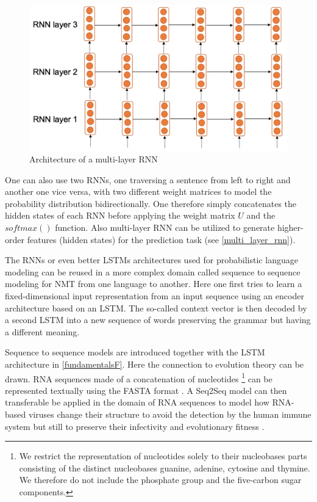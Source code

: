 \begin{figure}[ht]
	\centering
	\includegraphics[width=0.6\linewidth]{figures/multi_layer_rnn.png}
	\caption{Architecture of a multi-layer  \ac{RNN} \cite[p. 87]{Gertz2020}}
	\label{multi_layer_rnn}
\end{figure}

One can also use two \acp{RNN}, one traversing a sentence from left to right and another one vice versa, with two different weight matrices to model the probability distribution bidirectionally. One therefore simply concatenates the hidden states of each \ac{RNN} before applying the weight matrix $U$ and the $softmax()$ function. Also multi-layer \acs{RNN} can be utilized to generate higher-order features (hidden states) for the prediction task (see \autoref{multi_layer_rnn}). \cite{Gertz2020}

The \acp{RNN} or even better \acp{LSTM} architectures used for probabilistic language modeling can be reused in a more complex domain called sequence to sequence modeling for \ac{NMT} from one language to another. Here one first tries to learn a fixed-dimensional input representation from an input sequence using an encoder architecture based on an \ac{LSTM}. The so-called context vector is then decoded by a second \ac{LSTM} into a new sequence of words preserving the grammar but having a different meaning. \cite{Sutskever2014}

Sequence to sequence models are introduced together with the \ac{LSTM} architecture in \autoref{fundamentalsF}. Here the connection to evolution theory can be drawn. \ac{RNA} sequences made of a concatenation of nucleotides \footnote{We restrict the representation of nucleotides solely to their nucleobases parts consisting of the distinct nucleobases guanine, adenine, cytosine and thymine. We therefore do not include the phosphate group and the five-carbon sugar components.} can be represented textually using the FASTA format \cite{cockBiopythonFreelyAvailable2009}. A \ac{Seq2Seq} model can then transferable be applied in the domain of \ac{RNA} sequences to model how \ac{RNA}-based viruses change their structure to avoid the detection by the human immune system but still to preserve their infectivity and evolutionary fitness \cite{Hie2021}. 

